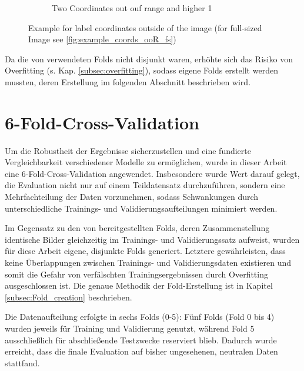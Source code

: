 \begin{figure}[h]
\begin{subfigure}[b]{0.45\textwidth}
        \caption{Two Coordinates out ouf range and higher 1}
        \label{fig:higher1}
    \end{subfigure}
    \caption[Example for label coordinates outside of the image]{Example for label coordinates outside of the image (for full-sized Image see \ref{fig:example_coords_ooR_fs})}
    \label{fig:example_coords_ooR}
\end{figure}

Da die von \citeauthor{Razakarivony2015} \cite{Razakarivony2015} verwendeten Folds nicht disjunkt waren, erhöhte sich das Risiko von Overfitting (s. Kap. \ref{subsec:overfitting}), sodass eigene Folds erstellt werden mussten, deren Erstellung im folgenden Abschnitt beschrieben wird. 






\section{6-Fold-Cross-Validation}
\label{sec_5Fold_CV}

Um die Robustheit der Ergebnisse sicherzustellen und eine fundierte Vergleichbarkeit verschiedener Modelle zu ermöglichen, wurde in dieser Arbeit eine 6-Fold-Cross-Validation angewendet. Insbesondere wurde Wert darauf gelegt, die Evaluation nicht nur auf einem Teildatensatz durchzuführen, sondern eine Mehrfachteilung der Daten vorzunehmen, sodass Schwankungen durch unterschiedliche Trainings- und Validierungsaufteilungen minimiert werden.

Im Gegensatz zu den von \citeauthor{Razakarivony2015} \cite{Razakarivony2015} bereitgestellten Folds, deren Zusammenstellung identische Bilder gleichzeitig im Trainings- und Validierungssatz aufweist, wurden für diese Arbeit eigene, disjunkte Folds generiert. Letztere gewährleisten, dass keine Überlappungen zwischen Trainings- und Validierungsdaten existieren und somit die Gefahr von verfälschten Trainingsergebnissen durch Overfitting ausgeschlossen ist. Die genaue Methodik der Fold-Erstellung ist in Kapitel \ref{subsec:Fold_creation} beschrieben. 

Die Datenaufteilung erfolgte in sechs Folds (0-5): Fünf Folds (Fold 0 bis 4) wurden jeweils für Training und Validierung genutzt, während Fold 5 ausschließlich für abschließende Testzwecke reserviert blieb. Dadurch wurde erreicht, dass die finale Evaluation auf bisher ungesehenen, neutralen Daten stattfand.

